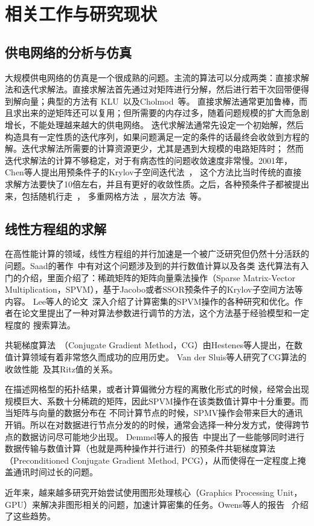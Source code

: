 \chapter{相关工作与研究现状}
\label{cha:relatedworks}

\section{供电网络的分析与仿真}

大规模供电网络的仿真是一个很成熟的问题。主流的算法可以分成两类：直接求解法和迭代求解法。直接求解法首先通过对矩阵进行分解，然后进行若干次回带便得到解向量；典型的方法有
KLU~\cite{davis2010algorithm}以及Cholmod~\cite{davis2005cholmod}等。
直接求解法通常更加鲁棒，而且求出来的逆矩阵还可以复用；但所需要的内存过多，随着问题规模的扩大而急剧增长，不能处理越来越大的供电网络。
迭代求解法通常先设定一个初始解，然后构造具有一定性质的迭代序列，如果问题满足一定的条件的话最终会收敛到方程的解。迭代求解法所需要的计算资源更少，尤其是遇到大规模的电路矩阵时；
然而迭代求解法的计算不够稳定，对于有病态性的问题收敛速度非常慢。2001年，Chen等人提出用预条件子的Krylov子空间迭代法~\cite{chen2001efficient}，
这个方法比当时传统的直接求解方法要快了10倍左右，并且有更好的收敛性质。之后，各种预条件子都被提出来，包括随机行走~\cite{qian2005power}，
多重网格方法~\cite{kozhaya2002multigrid}，层次方法~\cite{zhao2002hierarchical}等。


\section{线性方程组的求解}

在高性能计算的领域，线性方程组的并行加速是一个被广泛研究但仍然十分活跃的问题。Saad的著作~\cite{saad2003iterative}中有对这个问题涉及到的并行数值计算以及各类
迭代算法有入门的介绍，里面介绍了：稀疏矩阵的矩阵向量乘法操作（Sparse Matrix-Vector Multiplication，SPVM），基于Jacobo或者SSOR预条件子的Krylov子空间方法等内容。
Lee等人的论文~\cite{lee2004performance}深入介绍了计算密集的SPVM操作的各种研究和优化。作者在论文里提出了一种对算法参数进行调节的方法，这个方法基于经验模型和一定程度的
搜索算法。

共轭梯度算法~\cite{hestenes1952methods}（Conjugate Gradient Method，CG）由Hestenes等人提出，在数值计算领域有着非常悠久而成功的应用历史。
Van der Sluis等人研究了CG算法的收敛性能~\cite{van1986rate}及其Ritz值的关系。

在描述网格型的拓扑结果，或者计算偏微分方程的离散化形式的时候，经常会出现规模巨大、系数十分稀疏的矩阵，因此SPVM操作在该类数值计算中十分重要。而当矩阵与向量的数据分布在
不同计算节点的时候，SPMV操作会带来巨大的通讯开销。所以在对数据进行节点分发的的时候，通常会选择一种分发方式，使得跨节点的数据访问尽可能地少出现。
Demmel等人的报告~\cite{demmel1993parallel}中提出了一些能够同时进行数据传输与数值计算（也就是两种操作并行进行）的预条件共轭梯度算法（Preconditioned Conjugate Gradient Method, PCG），从而使得在一定程度上掩盖通讯时间过长的问题。

近年来，越来越多研究开始尝试使用图形处理核心（Graphics Processing Unit，GPU）来解决非图形相关的问题，加速计算密集的任务。Owens等人的报告~\cite{owens2007survey}
介绍了这些趋势。
